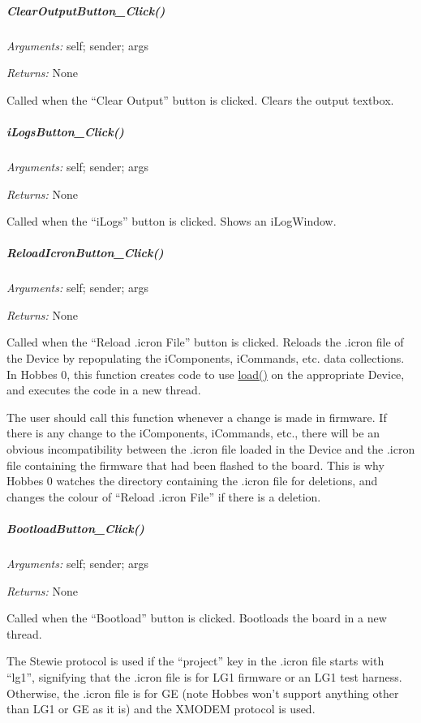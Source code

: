 \documentclass[12pt,letterpaper]{article}
\begin{document}
%
%
\subparagraph{ClearOutputButton\_Click()}
\label{4.3.1.3.9}

\emph{Arguments:} self; sender; args

\emph{Returns:} None

Called when the ``Clear Output'' button is clicked. Clears the output textbox.



%
%
\subparagraph{iLogsButton\_Click()}
\label{4.3.1.3.10}

\emph{Arguments:} self; sender; args

\emph{Returns:} None

Called when the ``iLogs'' button is clicked. Shows an iLogWindow.



%
%
\subparagraph{ReloadIcronButton\_Click()}
\label{4.3.1.3.11}

\emph{Arguments:} self; sender; args

\emph{Returns:} None

Called when the ``Reload .icron File'' button is clicked. Reloads the .icron file of the Device by repopulating the iComponents, iCommands, etc. data collections. In Hobbes 0, this function creates code to use \hyperref[4.1.1.0.3]{load()} on the appropriate Device, and executes the code in a new thread.

The user should call this function whenever a change is made in firmware. If there is any change to the iComponents, iCommands, etc., there will be an obvious incompatibility between the .icron file loaded in the Device and the .icron file containing the firmware that had been flashed to the board. This is why Hobbes 0 watches the directory containing the .icron file for deletions, and changes the colour of ``Reload .icron File'' if there is a deletion.



%
%
\subparagraph{BootloadButton\_Click()}
\label{4.3.1.3.12}

\emph{Arguments:} self; sender; args

\emph{Returns:} None

Called when the ``Bootload'' button is clicked. Bootloads the board in a new thread.

The Stewie protocol is used if the ``project'' key in the .icron file starts with ``lg1'', signifying that the .icron file is for LG1 firmware or an LG1 test harness. Otherwise, the .icron file is for GE (note Hobbes won't support anything other than LG1 or GE as it is) and the XMODEM protocol is used.
\end{document}
